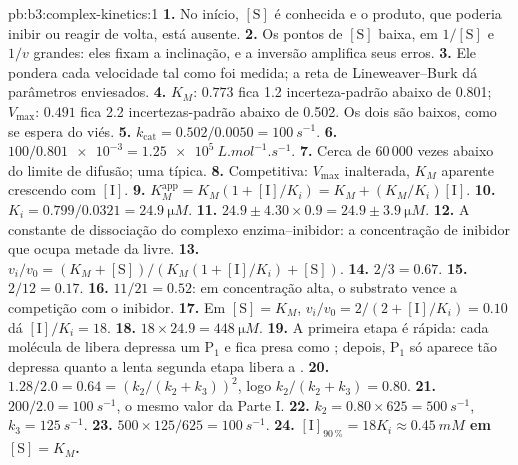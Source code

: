 \begin{solution}{pb:b3:complex-kinetics:1}
\textbf{1.} No início, $[\mathrm S]$ é conhecida e o produto, que poderia inibir ou reagir
de volta, está ausente.
\textbf{2.} Os pontos de $[\mathrm S]$ baixa, em $1/[\mathrm S]$ e $1/v$ grandes: eles fixam a inclinação,
e a inversão amplifica seus erros.
\textbf{3.} Ele pondera cada velocidade tal como foi medida; a reta de Lineweaver--Burk dá
parâmetros enviesados.
\textbf{4.} $K_M$: $0.773$ fica 1.2 incerteza-padrão abaixo de 0.801; $V_{\max}$: $0.491$ fica 2.2
incertezas-padrão abaixo de 0.502. Os dois são baixos, como se espera do viés.
\textbf{5.} $k_{\mathrm{cat}} = 0.502/0.0050 = \qty{100}{s^{-1}}$.
\textbf{6.} $100/\num{0.801e-3} = \qty{1.25e5}{L.mol^{-1}.s^{-1}}$.
\textbf{7.} Cerca de 60\,000 vezes abaixo do limite de difusão; uma  típica.
\textbf{8.} Competitiva: $V_{\max}$ inalterada, $K_M$ aparente crescendo com $[\mathrm I]$.
\textbf{9.} $K_M^{\mathrm{app}} = K_M(1 + [\mathrm I]/K_i) = K_M + (K_M/K_i)[\mathrm I]$.
\textbf{10.} $K_i = 0.799/0.0321 = \qty{24.9}{\micro M}$.
\textbf{11.} $24.9 \pm 4.30 \times 0.9 = 24.9 \pm \qty{3.9}{\micro M}$.
\textbf{12.} A constante de dissociação do complexo enzima--inibidor: a concentração
de inibidor que ocupa metade da  livre.
\textbf{13.} $v_i/v_0 = (K_M + [\mathrm S])/(K_M(1 + [\mathrm I]/K_i) + [\mathrm S])$.
\textbf{14.} $2/3 = 0.67$.
\textbf{15.} $2/12 = 0.17$.
\textbf{16.} $11/21 = 0.52$: em concentração alta, o substrato vence a competição com o
inibidor.
\textbf{17.} Em $[\mathrm S] = K_M$, $v_i/v_0 = 2/(2 + [\mathrm I]/K_i) = 0.10$ dá $[\mathrm I]/K_i = 18$.
\textbf{18.} $18 \times 24.9 = \qty{448}{\micro M}$.
\textbf{19.} A primeira etapa é rápida: cada molécula de  libera depressa um $\mathrm P_1$
e fica presa como ; depois, $\mathrm P_1$ só aparece tão depressa quanto a lenta
segunda etapa libera a .
\textbf{20.} $1.28/2.0 = 0.64 = (k_2/(k_2 + k_3))^2$, logo $k_2/(k_2 + k_3) = 0.80$.
\textbf{21.} $200/2.0 = \qty{100}{s^{-1}}$, o mesmo valor da Parte I.
\textbf{22.} $k_2 = 0.80 \times 625 = \qty{500}{s^{-1}}$, $k_3 = \qty{125}{s^{-1}}$.
\textbf{23.} $500 \times 125/625 = \qty{100}{s^{-1}}$.
\textbf{24.} \textbf{$[\mathrm I]_{90\,\%} = 18K_i \approx \qty{0.45}{mM}$ em $[\mathrm S] = K_M$.}
\end{solution}

